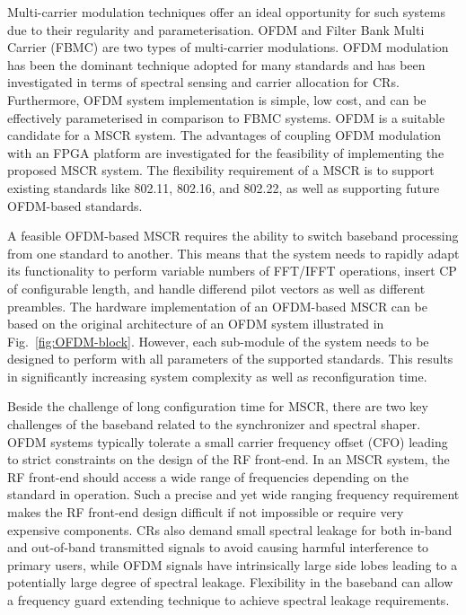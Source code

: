 Multi-carrier modulation techniques offer an ideal opportunity for such systems due to their regularity and parameterisation. OFDM and Filter Bank Multi Carrier (FBMC) are two types of multi-carrier modulations. OFDM modulation has been the dominant technique adopted for many standards and has been investigated in terms of spectral sensing and carrier allocation for CRs. 
Furthermore, OFDM system implementation is simple, low cost, and can be effectively parameterised in comparison to FBMC systems. OFDM is a suitable candidate for a MSCR system. The advantages of coupling OFDM modulation with an FPGA platform are investigated for the feasibility of implementing the proposed MSCR system. 
The flexibility requirement of a MSCR is to support existing standards like 802.11, 802.16, and 802.22, as well as supporting future OFDM-based standards.

A feasible OFDM-based MSCR requires the ability to switch baseband processing from one standard to another. This means that the system needs to rapidly adapt its functionality to perform variable numbers of FFT/IFFT operations, insert CP of configurable length, and handle differend pilot vectors as well as different preambles. The hardware implementation of an OFDM-based MSCR can be based on the original architecture of an OFDM system illustrated in Fig.~\ref{fig:OFDM-block}. However, each sub-module of the system needs to be designed to perform with all parameters of the supported standards. This results in significantly increasing system complexity as well as reconfiguration time.   

Beside the challenge of long configuration time for MSCR, there are two key challenges of the baseband related to the synchronizer and spectral shaper. OFDM systems typically tolerate a small carrier frequency offset (CFO) leading to strict constraints on the design of the RF front-end. In an MSCR system, the RF front-end should access a wide range of frequencies depending on the standard in operation. Such a precise and yet wide ranging frequency requirement makes the RF front-end design difficult if not impossible or require very expensive components.
CRs also demand small spectral leakage for both in-band and out-of-band transmitted signals to avoid causing harmful interference to primary users, while OFDM signals have intrinsically large side lobes leading to a potentially large degree of spectral leakage. 
Flexibility in the baseband can allow a frequency guard extending technique to achieve spectral leakage requirements.

